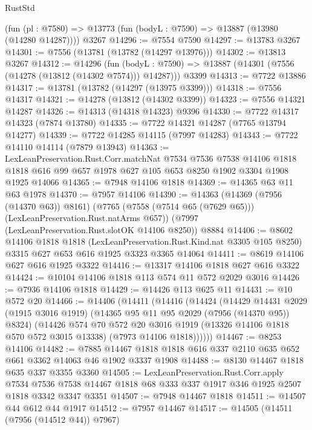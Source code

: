 \begin{lexlean}{RustStd}
\begin{coremodule}
{\begin{coremodule}
{{{{{{{{{{{{{{{{{{{{{{{{{{{{{{{{{{{{{{{{{{{    (fun (pl : @7580) => @13773 (fun (bodyL : @7590) => @13887 (@13980 (@14280 @14287))))
    @3267
@14296 := @7554 @7590
@14297 := @13783 @3267
@14301 := @7556 (@13781 (@13782 (@14297 @13976)))
@14302 := @13813 @3267
@14312 := @14296
    (fun (bodyL : @7590) => @13887 (@14301 (@7556 (@14278 (@13812 (@14302 @7574))) @14287)))
    @3399
@14313 := @7722 @13886
@14317 := @13781 (@13782 (@14297 (@13975 @3399)))
@14318 := @7556 @14317
@14321 := @14278 (@13812 (@14302 @3399))
@14323 := @7556 @14321 @14287
@14326 := @14313 (@14318 @14323) @9396
@14330 := @7722 @14317 @14323 (@7874 @13780)
@14335 := @7722 @14321 @14287 (@7765 @13794 @14277)
@14339 := @7722 @14285 @14115 (@7997 @14283)
@14343 := @7722 @14110 @14114 (@7879 @13943)
@14363 := LexLeanPreservation.Rust.Corr.matchNat
    @7534
    @7536
    @7538
    @14106
    @1818
    @1818
    @616
    @99
    @657
    @1978
    @627
    @105
    @653
    @8250
    @1902
    @3304
    @1908
    @1925
    @14066
@14365 := @7948 @14106 @1818
@14369 := @14365 @63 @11 @63 @1978
@14370 := @7957 @14106
@14390 := @14363
    (@14369 (@7956 (@14370 @63)) @8161)
    (@7765 (@7558 (@7514 @65 (@7629 @65))) (LexLeanPreservation.Rust.natArms @657))
    (@7997 (LexLeanPreservation.Rust.slotOK @14106 @8250))
    @8884
@14406 := @8602
    @14106
    @1818
    @1818
    (LexLeanPreservation.Rust.Kind.nat @3305 @105 @8250)
    @3315
    @627
    @653
    @616
    @1925
    @3323
    @3365
    @14064
@14411 := @8619 @14106 @627 @616 @1925 @3322
@14416 := @13317 @14106 @1818 @627 @616 @3322
@14424 := @10104 @14106 @1818 @113 @574 @11 @572 @2029 @3016
@14426 := @7936 @14106 @1818
@14429 := @14426 @113 @625 @11
@14431 := @10 @572 @20
@14466 := @14406
    (@14411
      (@14416
        (@14424
          (@14429
            @14431
            @2029
            (@1915 @3016 @1919)
            (@14365 @95 @11 @95 @2029 (@7956 (@14370 @95)) @8324)
            (@14426
              @574
              @70
              @572
              @20
              @3016
              @1919
              (@13326 @14106 @1818 @570 @572 @3015 @13338)
              (@7973 @14106 @1818))))))
@14467 := @8253 @14106
@14482 := @7885 @14467 @1818 @1818 @616 @337 @2110 @635 @652 @661 @3362 @14063 @46 @1902 @3337 @1908
@14488 := @8130 @14467 @1818 @635 @337 @3355 @3360
@14505 := LexLeanPreservation.Rust.Corr.apply
    @7534
    @7536
    @7538
    @14467
    @1818
    @68
    @333
    @337
    @1917
    @346
    @1925
    @2507
    @1818
    @3342
    @3347
    @3351
@14507 := @7948 @14467 @1818
@14511 := @14507 @44 @612 @44 @1917
@14512 := @7957 @14467
@14517 := @14505 (@14511 (@7956 (@14512 @44)) @7967)
}}}}}}}}}}}}}}}}}}}}}}}}}}}}}}}}}}}}}}}}}}}
\end{coremodule}}
\end{coremodule}
\end{lexlean}
